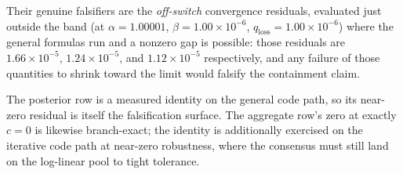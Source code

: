 \documentclass[
  english,
]{article}
\theoremstyle{plain}
\theoremstyle{definition}
\theoremstyle{remark}
\theoremstyle{definition}
\begin{document}
Their genuine falsifiers are the \emph{off-switch} convergence
residuals, evaluated just outside the band (at \(\alpha = 1.00001\),
\(\beta = 1.00 \times 10^{-6}\),
\(q_{\text{loss}} = 1.00 \times 10^{-6}\)) where the general formulas
run and a nonzero gap is possible: those residuals are
\(1.66 \times 10^{-5}\), \(1.24 \times 10^{-5}\), and
\(1.12 \times 10^{-5}\) respectively, and any failure of those
quantities to shrink toward the limit would falsify the containment
claim.

The posterior row is a measured identity on the general code path, so
its near-zero residual is itself the falsification surface. The
aggregate row's zero at exactly \(c=0\) is likewise branch-exact; the
identity is additionally exercised on the iterative code path at
near-zero robustness, where the consensus must still land on the
log-linear pool to tight tolerance.
\end{document}
